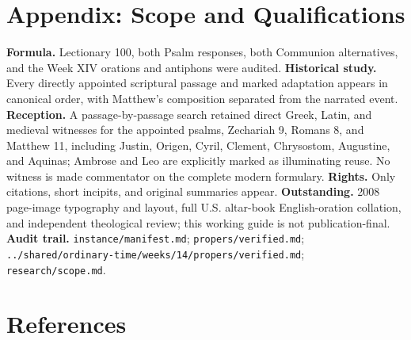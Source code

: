 \begin{deepstudy}
\clearpage

\section*{Appendix: Scope and Qualifications}

\begin{studyframe}
\textbf{Formula.} Lectionary 100, both Psalm responses, both Communion alternatives, and the Week XIV orations and antiphons were audited. \textbf{Historical study.} Every directly appointed scriptural passage and marked adaptation appears in canonical order, with Matthew's composition separated from the narrated event. \textbf{Reception.} A passage-by-passage search retained direct Greek, Latin, and medieval witnesses for the appointed psalms, Zechariah 9, Romans 8, and Matthew 11, including Justin, Origen, Cyril, Clement, Chrysostom, Augustine, and Aquinas; Ambrose and Leo are explicitly marked as illuminating reuse. No witness is made commentator on the complete modern formulary. \textbf{Rights.} Only citations, short incipits, and original summaries appear. \textbf{Outstanding.} 2008 page-image typography and layout, full U.S. altar-book English-oration collation, and independent theological review; this working guide is not publication-final. \textbf{Audit trail.} \nolinkurl{instance/manifest.md}; \nolinkurl{propers/verified.md}; \nolinkurl{../shared/ordinary-time/weeks/14/propers/verified.md}; \nolinkurl{research/scope.md}.
\end{studyframe}

\section*{References}


\end{deepstudy}
